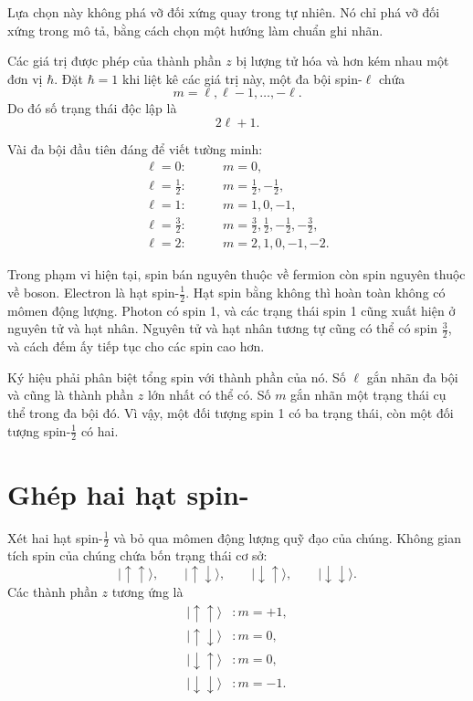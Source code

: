 Lựa chọn này không phá vỡ đối xứng quay trong tự nhiên. Nó chỉ phá vỡ đối xứng trong mô tả, bằng cách chọn một hướng làm chuẩn ghi nhãn.

Các giá trị được phép của thành phần \(z\) bị lượng tử hóa và hơn kém nhau một đơn vị \(\hbar\). Đặt \(\hbar=1\) khi liệt kê các giá trị này, một đa bội spin-\(\ell\) chứa
\begin{equation}
m=\ell,\ell-1,\ldots,-\ell.
\end{equation}
Do đó số trạng thái độc lập là
\begin{equation}
2\ell+1.
\end{equation}

Vài đa bội đầu tiên đáng để viết tường minh:
\begin{align}
\ell=0:&\qquad m=0,\\
\ell=\frac12:&\qquad m=\frac12,-\frac12,\\
\ell=1:&\qquad m=1,0,-1,\\
\ell=\frac32:&\qquad
m=\frac32,\frac12,-\frac12,-\frac32,\\
\ell=2:&\qquad m=2,1,0,-1,-2.
\end{align}

Trong phạm vi hiện tại, spin bán nguyên thuộc về fermion còn spin nguyên thuộc về boson. Electron là hạt spin-\(\tfrac12\). Hạt spin bằng không thì hoàn toàn không có mômen động lượng. Photon có spin 1, và các trạng thái spin 1 cũng xuất hiện ở nguyên tử và hạt nhân. Nguyên tử và hạt nhân tương tự cũng có thể có spin \(\tfrac32\), và cách đếm ấy tiếp tục cho các spin cao hơn.

Ký hiệu phải phân biệt tổng spin với thành phần của nó. Số \(\ell\) gắn nhãn đa bội và cũng là thành phần \(z\) lớn nhất có thể có. Số \(m\) gắn nhãn một trạng thái cụ thể trong đa bội đó. Vì vậy, một đối tượng spin 1 có ba trạng thái, còn một đối tượng spin-\(\tfrac12\) có hai.

\section{Ghép hai hạt spin-}

Xét hai hạt spin-\(\tfrac12\) và bỏ qua mômen động lượng quỹ đạo của chúng. Không gian tích spin của chúng chứa bốn trạng thái cơ sở:
\begin{equation}
|\uparrow\uparrow\rangle,\qquad
|\uparrow\downarrow\rangle,\qquad
|\downarrow\uparrow\rangle,\qquad
|\downarrow\downarrow\rangle.
\end{equation}
Các thành phần \(z\) tương ứng là
\begin{align}
|\uparrow\uparrow\rangle &: m=+1,\\
|\uparrow\downarrow\rangle &: m=0,\\
|\downarrow\uparrow\rangle &: m=0,\\
|\downarrow\downarrow\rangle &: m=-1.
\end{align}

